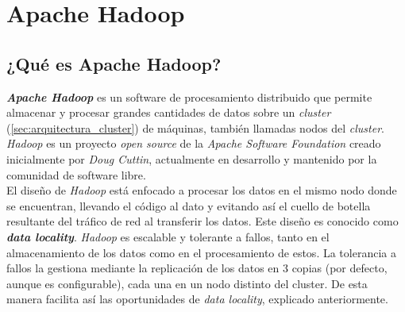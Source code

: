 
\chapter{Apache\textsuperscript{\footnotesize\texttrademark} Hadoop\textsuperscript{\footnotesize\textregistered}}
\section{¿Qué es Apache Hadoop?}\label{sec:que_es_apache_hadoop}
\textbf{\textit{Apache Hadoop}} es un software de procesamiento distribuido que permite almacenar 
y procesar grandes cantidades de datos sobre un \textit{cluster} (\autoref{sec:arquitectura_cluster})
 de máquinas, también llamadas nodos del \textit{cluster}.
\textit{Hadoop} es un proyecto \textit{open source} de la \textit{Apache Software Foundation} creado inicialmente por
\textit{Doug Cuttin}, actualmente en desarrollo y mantenido por la comunidad de software libre.\\
El diseño de \textit{Hadoop} está enfocado a procesar los datos en el mismo nodo donde se encuentran,
llevando el código al dato y evitando así el cuello de botella resultante del tráfico de red
al transferir los datos. Este diseño es conocido como \textit{\textbf{data locality}}.
\textit{Hadoop} es escalable y tolerante a fallos, tanto en el almacenamiento de los datos como en el
procesamiento de estos. La tolerancia a fallos la gestiona mediante la replicación de los datos
en 3 copias (por defecto, aunque es configurable), cada una en un nodo distinto del cluster. 
De esta manera facilita así las oportunidades de \textit{data locality}, explicado anteriormente.

